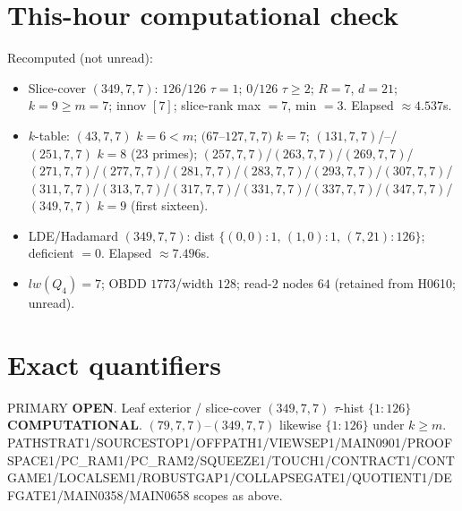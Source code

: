 \documentclass[11pt]{article}
\begin{document}
\section*{This-hour computational check}
Recomputed (not unread):
\begin{itemize}
\item Slice-cover $(349,7,7)$: $126/126$ $\tau{=}1$; $0/126$ $\tau{\ge}2$; $R{=}7$, $d{=}21$;
  $k{=}9{\ge}m{=}7$; innov $[7]$; slice-rank max $=7$, min $=3$. Elapsed $\approx4.537$s.
\item $k$-table: $(43,7,7)$ $k{=}6{\lt}m$; $(67$--$127,7,7)$ $k{=}7$;
  $(131,7,7)$/--/$(251,7,7)$ $k{=}8$ (23 primes); $(257,7,7)$/$(263,7,7)$/$(269,7,7)$/$(271,7,7)$/$(277,7,7)$/$(281,7,7)$/$(283,7,7)$/$(293,7,7)$/$(307,7,7)$/$(311,7,7)$/$(313,7,7)$/$(317,7,7)$/$(331,7,7)$/$(337,7,7)$/$(347,7,7)$/$(349,7,7)$ $k{=}9$ (first sixteen).
\item LDE/Hadamard $(349,7,7)$: dist $\{(0,0){:}1,\,(1,0){:}1,\,(7,21){:}126\}$; deficient $=0$. Elapsed $\approx7.496$s.
\item $lw(Q_4)=7$; OBDD $1773$/width $128$; read-$2$ nodes $64$ (retained from H0610; unread).
\end{itemize}

\section*{Exact quantifiers}
PRIMARY \textbf{OPEN}. Leaf exterior / slice-cover $(349,7,7)$ $\tau$-hist $\{1{:}126\}$ \textbf{COMPUTATIONAL}.
$(79,7,7)$--$(349,7,7)$ likewise $\{1{:}126\}$ under $k{\ge}m$.
PATHSTRAT1/SOURCESTOP1/OFFPATH1/VIEWSEP1/MAIN0901/PROOFSPACE1/PC\_RAM1/PC\_RAM2/SQUEEZE1/TOUCH1/CONTRACT1/CONTGAME1/LOCALSEM1/ROBUSTGAP1/COLLAPSEGATE1/QUOTIENT1/DEFGATE1/MAIN0358/MAIN0658 scopes as above.
\end{document}
